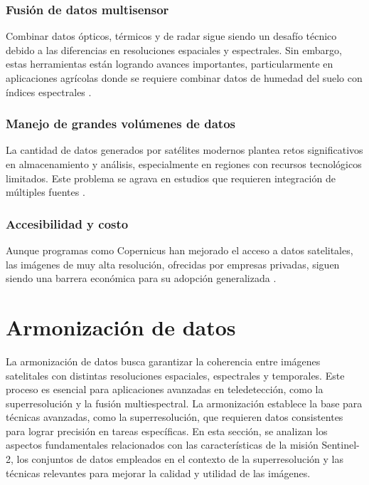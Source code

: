         \subsubsection{Fusión de datos multisensor}
            Combinar datos ópticos, térmicos y de radar sigue siendo un desafío técnico debido a las diferencias en resoluciones espaciales y espectrales. Sin embargo, estas herramientas están logrando avances importantes, particularmente en aplicaciones agrícolas donde se requiere combinar datos de humedad del suelo con índices espectrales \autocite{rast2019copernicus}.
        

        \subsubsection{Manejo de grandes volúmenes de datos}
            La cantidad de datos generados por satélites modernos plantea retos significativos en almacenamiento y análisis, especialmente en regiones con recursos tecnológicos limitados. Este problema se agrava en estudios que requieren integración de múltiples fuentes \autocite{matgen2020feasibility}.


        \subsubsection{Accesibilidad y costo}
            Aunque programas como Copernicus han mejorado el acceso a datos satelitales, las imágenes de muy alta resolución, ofrecidas por empresas privadas, siguen siendo una barrera económica para su adopción generalizada \autocite{denis2016evolution}.

\section{Armonización de datos}

    La armonización de datos busca garantizar la coherencia entre imágenes satelitales con distintas resoluciones espaciales, espectrales y temporales. Este proceso es esencial para aplicaciones avanzadas en teledetección, como la superresolución y la fusión multiespectral. La armonización establece la base para técnicas avanzadas, como la superresolución, que requieren datos consistentes para lograr precisión en tareas específicas. En esta sección, se analizan los aspectos fundamentales relacionados con las características de la misión Sentinel-2, los conjuntos de datos empleados en el contexto de la superresolución y las técnicas relevantes para mejorar la calidad y utilidad de las imágenes.

